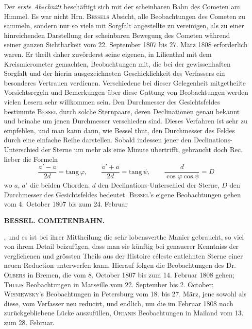 Der \emph{erste Abschnitt} beschäftigt sich mit der scheinbaren Bahn des Cometen am Himmel. Es war nicht Hrn. \textsc{Bessels} Absicht, alle Beobachtungen des Cometen zu sammeln, sondern nur so viele mit Sorgfalt angestellte zu vereinigen, als zu einer hinreichenden Darstellung der scheinbaren Bewegung des Cometen während seiner ganzen Sichtbarkeit vom 22. September 1807 bis 27. März 1808 erforderlich waren. Er theilt daher zuvörderst seine eigenen, in Lilienthal mit dem Kreismicrometer gemachten, Beobachtungen mit, die bei der gewissenhaften Sorgfalt und der hierin ausgezeichneten Geschicklichkeit des Verfassers ein besonderes Vertrauen verdienen. Verschiedene bei dieser Gelegenheit mitgetheilte Vorsichtsregeln und Bemerkungen über diese Gattung von Beobachtungen werden vielen Lesern sehr willkommen sein. Den Durchmesser des Gesichtsfeldes bestimmte \textsc{Bessel} durch solche Sternpaare, deren Declinationen genau bekannt und beinahe um jenen Durchmesser verschieden sind. Dieses Verfahren ist sehr zu empfehlen, und man kann dann, wie Bessel thut, den Durchmesser des Feldes durch eine einfache Reihe darstellen. Sobald indessen jener den Declinations-Unterschied der Sterne um mehr als eine Minute übertrifft, gebraucht doch Rec. lieber die Formeln \[
\frac{a'-a}{2d}=\mathrm{tang}\,\varphi,\qquad \frac{a'+a}{2d}=\mathrm{tang}\,\psi,\qquad \frac{d}{\cos\varphi\cos\psi}=D
\] wo $a$, $a'$ die beiden Chorden, $d$ den Declinations-Unterschied der Sterne, $D$ den Durchmesser des Gesichtsfeldes bedeutet. \textsc{Bessel}'s eigene Beobachtungen gehen vom 4. October 1807 bis zum 24. Februar\par
\clearpage
{}
\noindent\makebox[10mm][l]{}%
\parbox[b]{\dimexpr\textwidth-20mm\relax}{\centering\small\textbf{BESSEL. COMETENBAHN.}}%
\par\nobreak\medskip
{}, und es ist bei ihrer Mittheilung die sehr lobensverthe Manier gebraucht, so viel von ihrem Detail beizufügen, dass man sie künftig bei genauerer Kenntniss der verglichenen und grössten Theils aus der Histoire céleste entlehnten Sterne einer neuen Reduction unterwerfen kann. Hierauf folgen die Beobachtungen des Dr. \textsc{Olbers} in Bremen, die vom 8. October 1807 bis zum 14. Februar 1808 gehen; \textsc{Thulis} Beobachtungen in Marseille vom 22. September bis 2. October; \textsc{Wisniewsky}'s Beobachtungen in Petersburg vom 18. bis 27. März, jene sowohl als diese, vom Verfasser neu reducirt, und endlich, um die im Februar 1808 noch zurückgebliebene Lücke auszufüllen, \textsc{Orianis} Beobachtungen in Mailand vom 13. zum 28. Februar.

